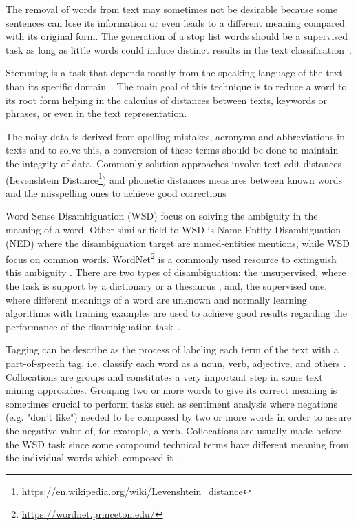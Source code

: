 The removal of words from text may sometimes not be desirable because some sentences can lose its information or even leads to a different meaning compared with its original form. The generation of a stop list words should be a supervised task as long as little words could induce distinct results in the text classification~\cite{kn:Riloff1995}.

Stemming is a task that depends mostly from the speaking language of the text than its specific domain~\cite{kn:Stavrianou2007}. The main goal of this technique is to reduce a word to its root form helping in the calculus of distances between texts, keywords or phrases, or even in the text representation.

The noisy data is derived from spelling mistakes, acronyms and abbreviations in texts and to solve this, a conversion of these terms should be done to maintain the integrity of data. Commonly solution approaches involve text edit distances (Levenshtein Distance\footnote{\url{https://en.wikipedia.org/wiki/Levenshtein_distance}}) and phonetic distances measures between known words and the misspelling ones to achieve good corrections~\cite{kn:Bontcheva2013} 

Word Sense Disambiguation (WSD) focus on solving the ambiguity in the meaning of a word. Other similar field to WSD is Name Entity Disambiguation (NED) where the disambiguation target are named-entities mentions, while WSD focus on common words. WordNet\footnote{\url{https://wordnet.princeton.edu/}} is a commonly used resource to extinguish this ambiguity \cite{kn:Chang2016}. There are two types of disambiguation: the unsupervised, where the task is support by a dictionary or a thesaurus \cite{kn:Stavrianou2007}; and, the supervised one, where different meanings of a word are unknown and normally learning algorithms with training examples are used to achieve good results regarding the performance of the disambiguation task~\cite{kn:Yarowsky1995}.

Tagging can be describe as the process of labeling each term of the text with a part-of-speech tag, i.e. classify each word as a noun, verb, adjective, and others \cite{kn:Hotho2005}. Collocations are groups and constitutes a very important step in some text mining approaches. Grouping two or more words to give its correct meaning is sometimes crucial to perform tasks such as sentiment analysis where negations (e.g. "don't like") needed to be composed by two or more words in order to assure the negative value of, for example, a verb. Collocations are usually made before the WSD task since some compound technical terms have different meaning from the individual words which composed it \cite{kn:Stavrianou2007}.

